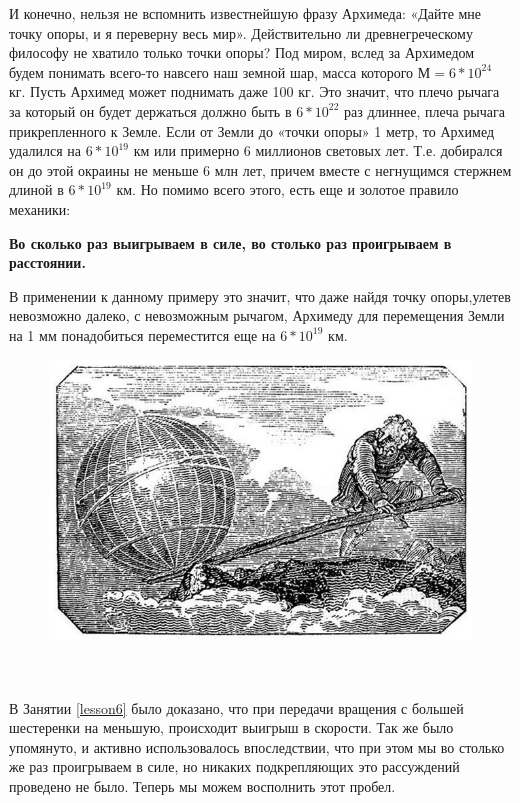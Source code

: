 И конечно,  нельзя не вспомнить известнейшую фразу Архимеда: «Дайте мне точку опоры, и я переверну весь мир». Действительно ли древнегреческому философу не хватило только точки опоры? Под миром, вслед за Архимедом будем понимать всего-то навсего наш земной шар, масса которого \(М=6*10^24\) кг.  Пусть Архимед может поднимать даже 100 кг. Это значит, что плечо рычага за который он будет держаться должно быть в \(6*10^22\) раз длиннее, плеча рычага прикрепленного к Земле. Если от Земли до «точки опоры» 1 метр, то Архимед удалился на \(6*10^19\) км или примерно 6 миллионов световых лет. Т.е. добирался он до этой окраины не меньше 6 млн лет, причем вместе с негнущимся стержнем длиной в \(6*10^19\) км. Но помимо всего этого, есть еще и золотое правило механики:

{\bfseries Во сколько раз выигрываем в силе, во столько раз проигрываем в расстоянии.}

В применении к данному примеру это значит, что даже найдя точку опоры,улетев невозможно далеко, с невозможным рычагом, Архимеду для перемещения Земли на 1 мм понадобиться переместится еще на \(6*10^19\) км.

\begin{figure}[h!]
	\begin{center}
		\includegraphics[width=1\linewidth]{chapters/chapter20/images/3}
		\caption{}
		\label{ris:image20x3}
	\end{center}
\end{figure}

{\hypertarget{lesson20x3}{}}\\\\

В Занятии \ref{lesson6} было доказано, что при передачи вращения с большей шестеренки на меньшую, происходит выигрыш в скорости. Так же было упомянуто, и активно использовалось впоследствии, что при этом мы во столько же раз проигрываем в силе, но никаких подкрепляющих это рассуждений проведено не было. Теперь мы можем восполнить этот пробел.

